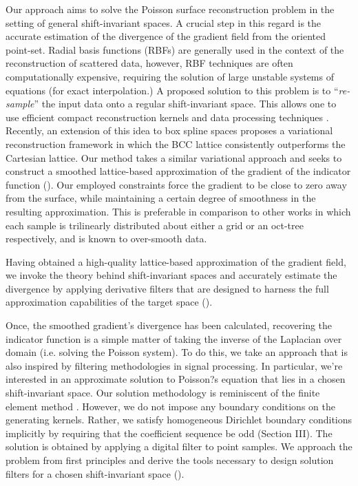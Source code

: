 Our approach aims to solve the Poisson surface reconstruction problem
in the setting of general shift-invariant spaces. A crucial step in this
regard is the accurate estimation of the divergence of the gradient
field from the oriented point-set. Radial basis functions (RBFs) are
generally used in the context of the reconstruction of scattered data, 
however, RBF techniques are often computationally
expensive, requiring the solution of large unstable systems of
equations (for exact interpolation.) A proposed solution to this
problem is to ``\emph{re-sample}'' the input data onto a regular
shift-invariant space. This allows one to use efficient compact
reconstruction kernels and data processing techniques
\cite{variational,onvari}. Recently, an extension of this idea to box
spline spaces \cite{xu2012rec} proposes a variational reconstruction
framework in which the BCC lattice consistently outperforms the
Cartesian lattice. Our method takes a similar variational approach and
seeks to construct a smoothed lattice-based approximation of the
gradient of the indicator function (). Our employed
constraints force the gradient to be close to zero away from the
surface, while maintaining a certain degree of smoothness in the
resulting approximation. This is preferable in comparison to other
works \cite{fftk,Kazhdan06,screenedk} in which each sample is
trilinearly distributed about either a grid or an oct-tree
respectively, and is known to over-smooth data.

Having obtained a high-quality lattice-based approximation of the
gradient field, we invoke the theory behind shift-invariant spaces
and accurately estimate the divergence by applying derivative filters
that are designed to harness the full approximation capabilities of
the target space (). 

Once, the smoothed gradient's divergence has been calculated, recovering the indicator
function is a simple matter of taking the inverse of the Laplacian over domain 
(i.e. solving the Poisson system). To do this, we take an approach that is also inspired 
by filtering methodologies in signal processing. In particular, we're interested in 
an approximate solution to Poisson?s equation that lies in a chosen shift-invariant 
space. Our solution methodology is reminiscent of the finite 
element method \cite{finite_el}. However, we do not impose any boundary 
conditions on the generating kernels. Rather, we satisfy homogeneous 
Dirichlet boundary conditions implicitly by requiring that the coefficient sequence be odd 
(Section III). The solution is obtained by applying a digital filter to point samples. 
We approach the problem from first principles and derive the tools necessary 
to design solution filters for a chosen shift-invariant space ().
